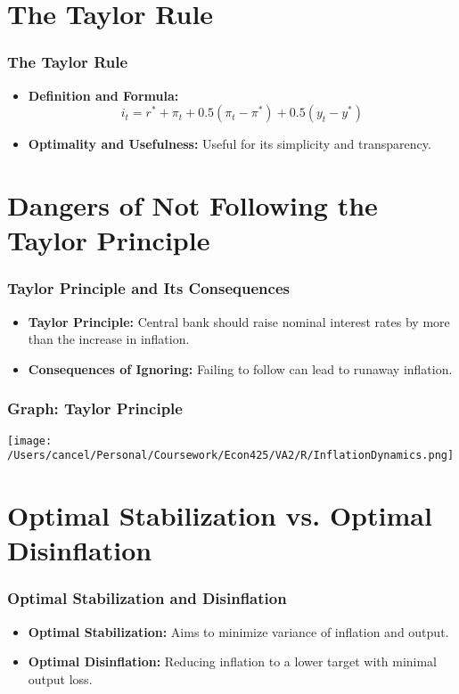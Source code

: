 \documentclass{beamer}
\begin{document}
\section{The Taylor Rule}

\begin{frame}
    \frametitle{The Taylor Rule}
    \begin{itemize}
        \item \textbf{Definition and Formula:}
        \begin{equation*}
            i_t = r^* + \pi_t + 0.5(\pi_t - \pi^*) + 0.5(y_t - y^*)
        \end{equation*}
        \item \textbf{Optimality and Usefulness:} Useful for its simplicity and transparency.
    \end{itemize}
\end{frame}

\section{Dangers of Not Following the Taylor Principle}

\begin{frame}
    \frametitle{Taylor Principle and Its Consequences}
    \begin{itemize}
        \item \textbf{Taylor Principle:} Central bank should raise nominal interest rates by more than the increase in inflation.
        \item \textbf{Consequences of Ignoring:} Failing to follow can lead to runaway inflation.
    \end{itemize}
\end{frame}

\begin{frame}
    \frametitle{Graph: Taylor Principle}
    \begin{center}
        \texttt{[image: /Users/cancel/Personal/Coursework/Econ425/VA2/R/InflationDynamics.png]}
    \end{center}
\end{frame}

\section{Optimal Stabilization vs. Optimal Disinflation}

\begin{frame}
    \frametitle{Optimal Stabilization and Disinflation}
    \begin{itemize}
        \item \textbf{Optimal Stabilization:} Aims to minimize variance of inflation and output.
        \item \textbf{Optimal Disinflation:} Reducing inflation to a lower target with minimal output loss.
    \end{itemize}
\end{frame}
\end{document}
